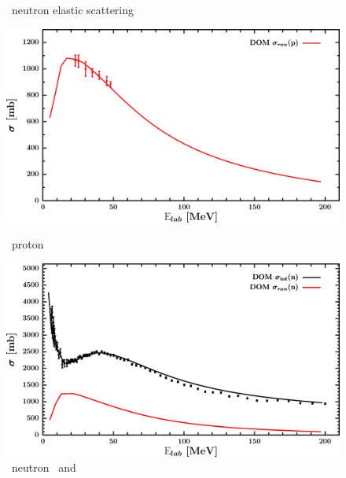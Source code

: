 \begin{figure}[hbtp]
\begin{minipage}{0.47\textwidth}
        \caption*{\caEight\ neutron elastic scattering}
        \label{DOMFitData_ca48_neutron_elastic}
    \end{minipage}
\end{figure}
\vspace{0.70in}
\begin{figure}[hbtp]
    \centering
    \begin{minipage}{0.47\textwidth}
        \centering
        \includegraphics[width=\linewidth]{figures/ca48_protonInelastic.png}
        \caption*{\caEight\ proton \rxn}
        \label{DOMFitData_ca48_proton_inelastic}
    \end{minipage}\hspace{6pt}
    \begin{minipage}{0.47\textwidth}
        \centering
        \includegraphics[width=\textwidth]{figures/ca48_neutronInelastic.png}
        \caption*{\caEight\ neutron \rxn\ and \tot}
        \label{DOMFitData_ca48_neutron_inelastic}
    \end{minipage}
\end{figure}
